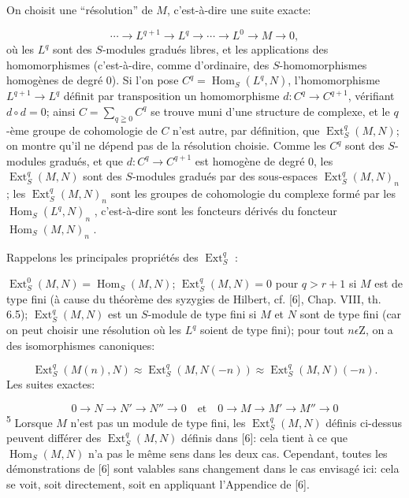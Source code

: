 On choisit une ``résolution'' de $M$, c'est-à-dire une suite exacte:

\begin{equation*}
\cdots \to L^{q+1} \to L^q \to \cdots \to L^0 \to M \to 0,
\end{equation*}
où les $L^q$ sont des $S$-modules gradués libres, et les applications des homomorphismes (c'est-à-dire, comme d'ordinaire, des $S$-homomorphismes homogènes de degré 0). Si l'on pose $C^q = \operatorname{Hom}_S(L^q, N)$, l'homomorphisme $L^{q+1} \to L^q$ définit par transposition un homomorphisme $d:C^q \to C^{q+1}$, vérifiant $d \circ d = 0$; ainsi $C = \sum\nolimits_{q \geqq 0} C^q$ se trouve muni d'une structure de complexe, et le $q$-ème groupe de cohomologie de $C$ n'est autre, par définition, que $\operatorname{Ext}_S^q(M, N)$; on montre qu'il ne dépend pas de la résolution choisie. Comme les $C^q$ sont des $S$-modules gradués, et que $d:C^q \to C^{q+1}$ est homogène de degré 0, les $\operatorname{Ext}_S^q(M, N)$ sont des $S$-modules gradués par des sous-espaces $\operatorname{Ext}_S^q(M, N)_n$ ; les $\operatorname{Ext}_S^q(M, N)_n$ sont les groupes de cohomologie du complexe formé par les $\operatorname{Hom}_S(L^q, N)_n$ , c'est-à-dire sont les foncteurs dérivés du foncteur $\operatorname{Hom}_S(M, N)_n$ .

Rappelons les principales propriétés des $\operatorname{Ext}_S^q$ :

$\operatorname{Ext}_S^0(M, N) = \operatorname{Hom}_S(M, N)$; $\operatorname{Ext}_S^q(M, N) = 0$ pour $q > r + 1$ si $M$ est de type fini (à cause du théorème des syzygies de Hilbert, cf. [6], Chap. VIII, th. 6.5); $\operatorname{Ext}_S^q(M, N)$ est un $S$-module de type fini si $M$ et $N$ sont de type fini (car on peut choisir une résolution où les $L^q$ soient de type fini); pour tout $n \epsilon \mathrm{Z}$, on a des isomorphismes canoniques:

\begin{equation*}
\operatorname{Ext}_S^q(M(n), N) \approx \operatorname{Ext}_S^q(M, N(-n)) \approx \operatorname{Ext}_S^q(M, N)(-n).
\end{equation*}
Les suites exactes:

\begin{equation*}
0 \to N \to N' \to N'' \to 0 \quad \mathrm{et} \quad 0 \to M \to M' \to M'' \to 0
\end{equation*}
\textsuperscript{5} Lorsque $M$ n'est pas un module de type fini, les $\operatorname{Ext}_S^q (M, N)$ définis ci-dessus peuvent différer des $\operatorname{Ext}_S^q (M, N)$ définis dans [6]: cela tient à ce que $\operatorname{Hom}_S (M, N)$ n'a pas le même sens dans les deux cas. Cependant, toutes les démonstrations de [6] sont valables sans changement dans le cas envisagé ici: cela se voit, soit directement, soit en appliquant l'Appendice de [6].


